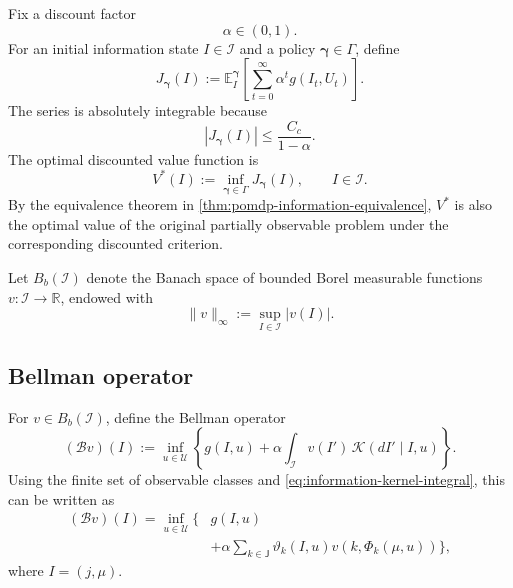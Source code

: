 \documentclass[10pt,twocolumn]{article}
\theoremstyle{remark}
\newcommand{\R}{\mathbb{R}}
\newcommand{\E}{\mathbb{E}}
\newcommand{\Ucal}{\mathcal{U}}
\newcommand{\Ical}{\mathcal{I}}
\begin{document}
Fix a discount factor
\begin{equation*}
	\alpha\in(0,1).
	\label{eq:discount-factor}
\end{equation*}
For an initial information state \(I\in\Ical\) and a policy \(\boldsymbol\gamma\in\Gamma\), define
\begin{equation}
	J_{\boldsymbol\gamma}(I)
	:=
	\E_I^{\boldsymbol\gamma}
	\left[
	\sum_{t=0}^{\infty}
	\alpha^t g(I_t,U_t)
	\right].
	\label{eq:discounted-policy-cost}
\end{equation}
The series is absolutely integrable because
\begin{equation*}
	|J_{\boldsymbol\gamma}(I)|
	\leq \frac{C_c}{1-\alpha}.
	\label{eq:discounted-cost-bound}
\end{equation*}
The optimal discounted value function is
\begin{equation}
	V^*(I)
	:=
	\inf_{\boldsymbol\gamma\in\Gamma}
	J_{\boldsymbol\gamma}(I),
	\qquad I\in\Ical.
	\label{eq:optimal-discounted-value}
\end{equation}
By the equivalence theorem in \cref{thm:pomdp-information-equivalence}, \(V^*\) is also the optimal value of the original partially observable problem under the corresponding discounted criterion.

Let \(B_b(\Ical)\) denote the Banach space of bounded Borel measurable functions \(v:\Ical\to\R\), endowed with
\[
\|v\|_\infty
:=\sup_{I\in\Ical}|v(I)|.
\]

\subsection{Bellman operator}
\label{subsec:bellman-operator}

For \(v\in B_b(\Ical)\), define the Bellman operator
\begin{equation}
	(\mathcal Bv)(I)
	:=
	\inf_{u\in\Ucal}
	\left\{
	g(I,u)
	+
	\alpha
	\int_{\Ical}
	v(I')\,\mathcal K(dI'\mid I,u)
	\right\}.
	\label{eq:bellman-operator}
\end{equation}
Using the finite set of observable classes and \cref{eq:information-kernel-integral}, this can be written as
\begin{equation*}
	\begin{aligned}
		(\mathcal Bv)(I)
		=\inf_{u\in\Ucal}
		\Bigg\{
		&g(I,u)
		\\
		&+\alpha
		\sum_{k\in\mathsf J}
		\vartheta_k(I,u)
		v\!\left(k,\Phi_k(\mu,u)\right)
		\Bigg\},
	\end{aligned}
	\label{eq:bellman-operator-explicit}
\end{equation*}
where \(I=(j,\mu)\).
\end{document}
